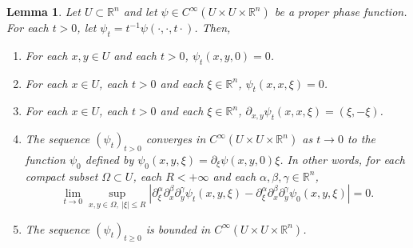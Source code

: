 \documentclass[10pt,twoside]{article}
\newcommand{\R}{\mathbb{R}}
\numberwithin{theorem}{section}
\newtheorem{lemma}[theorem]{Lemma}
\begin{document}
\begin{lemma}\label{l.toolbox}
  Let $U\subset\R^n$ and let $\psi\in C^\infty(U\times U\times\R^n)$ be a proper phase function. For each $t>0$, let $\psi_t=t^{-1}\psi(\cdot,\cdot,t\cdot)$. Then,
  \begin{enumerate}
  \item For each $x,y\in U$ and each $t>0$, $\psi_t(x,y,0)=0$.
  \item For each $x\in U$, each $t>0$ and each $\xi\in\R^n$, $\psi_t(x,x,\xi)=0$.
  \item For each $x\in U$, each $t>0$ and each $\xi\in\R^n$, $\partial_{x,y}\psi_t(x,x,\xi)=(\xi,-\xi)$.
  \item The sequence $(\psi_t)_{t>0}$ converges in $C^\infty(U\times U\times\R^n)$ as $t\rightarrow 0$ to the function $\psi_0$ defined by $\psi_0(x,y,\xi)=\partial_\xi\psi(x,y,0)\xi$. In other words, for each compact subset $\Omega\subset U$, each $R<+\infty$ and each $\alpha,\beta,\gamma\in\R^n$,
    \[\lim_{t\rightarrow 0}\sup_{x,y\in\Omega,\ |\xi|\leq R}\left|\partial^\alpha_\xi\partial^\beta_x\partial^\gamma_y\psi_t(x,y,\xi)-\partial^\alpha_\xi\partial^\beta_x\partial^\gamma_y\psi_0(x,y,\xi)\right|=0.\]
   \item The sequence $(\psi_t)_{t\geq 0}$ is bounded in $C^\infty(U\times U\times\R^n)$.
  \end{enumerate}
\end{lemma}
\end{document}
